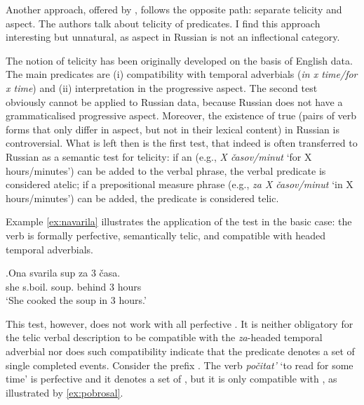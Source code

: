 Another approach, offered by \citet{PaduchevaPentus:08}, follows the opposite path: separate telicity and aspect. The authors talk about telicity of  predicates. I find this approach interesting but unnatural, as aspect in Russian is not an inflectional category. 

The notion of telicity has been originally developed on the basis of English data. The main  predicates are (i) compatibility with temporal adverbials (\textit{in x time/for x time}) and (ii) interpretation in the progressive aspect. The second test obviously cannot be applied to Russian data, because Russian does not have a grammaticalised progressive aspect. Moreover, the existence of true  (pairs of verb forms that only differ in aspect, but not in their lexical content) in Russian is controversial.
What is left then is the first test, that indeed is often transferred to Russian as a semantic test for telicity: if an  (e.g., \textit{X \v{c}asov/minut} `for X hours/minutes') can be added to the verbal phrase, the verbal predicate is considered atelic; if a prepositional measure phrase (e.g., \textit{za X \v{c}asov/minut} `in X hours/minutes') can be added, the predicate is considered telic.

Example \ref{ex:navarila} illustrates the application of the test in the basic case: the verb is formally perfective, semantically telic, and compatible with headed temporal adverbials. 

\exg.\label{ex:navarila}Ona svarila\textsuperscript{\PF} sup za 3 \v{c}asa.\\
she s.boil. soup. behind 3 hours\\
\trans `She cooked the soup in 3 hours.'

This test, however, does not work with all perfective . It is neither obligatory for the telic verbal description to be compatible with the \textit{za}-headed temporal adverbial nor does such compatibility indicate that the predicate denotes a set of single completed events. Consider the prefix . The verb \textit{po\v{c}itat'}\textsuperscript{\PF} `to read for some time' is perfective and it denotes a set of , but it is only compatible with , as illustrated by \ref{ex:pobrosal}.

